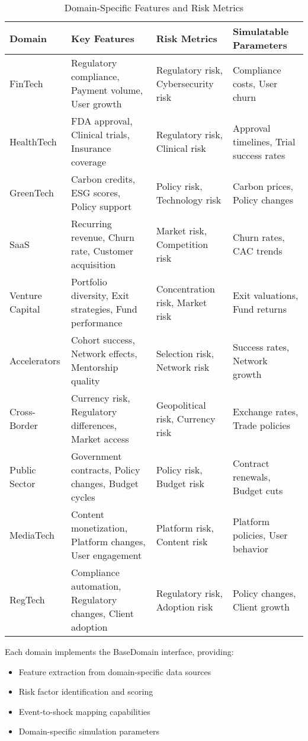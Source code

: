 \begin{table}[H]
\centering
\caption{Domain-Specific Features and Risk Metrics}
\label{tab:domain_features}
\begin{tabular}{@{}llll@{}}
\toprule
\textbf{Domain} & \textbf{Key Features} & \textbf{Risk Metrics} & \textbf{Simulatable Parameters} \\
\midrule
FinTech & Regulatory compliance, Payment volume, User growth & Regulatory risk, Cybersecurity risk & Compliance costs, User churn \\
HealthTech & FDA approval, Clinical trials, Insurance coverage & Regulatory risk, Clinical risk & Approval timelines, Trial success rates \\
GreenTech & Carbon credits, ESG scores, Policy support & Policy risk, Technology risk & Carbon prices, Policy changes \\
SaaS & Recurring revenue, Churn rate, Customer acquisition & Market risk, Competition risk & Churn rates, CAC trends \\
Venture Capital & Portfolio diversity, Exit strategies, Fund performance & Concentration risk, Market risk & Exit valuations, Fund returns \\
Accelerators & Cohort success, Network effects, Mentorship quality & Selection risk, Network risk & Success rates, Network growth \\
Cross-Border & Currency risk, Regulatory differences, Market access & Geopolitical risk, Currency risk & Exchange rates, Trade policies \\
Public Sector & Government contracts, Policy changes, Budget cycles & Policy risk, Budget risk & Contract renewals, Budget cuts \\
MediaTech & Content monetization, Platform changes, User engagement & Platform risk, Content risk & Platform policies, User behavior \\
RegTech & Compliance automation, Regulatory changes, Client adoption & Regulatory risk, Adoption risk & Policy changes, Client growth \\
\bottomrule
\end{tabular}
\end{table}

Each domain implements the BaseDomain interface, providing:
\begin{itemize}
    \item Feature extraction from domain-specific data sources
    \item Risk factor identification and scoring
    \item Event-to-shock mapping capabilities
    \item Domain-specific simulation parameters
\end{itemize}

